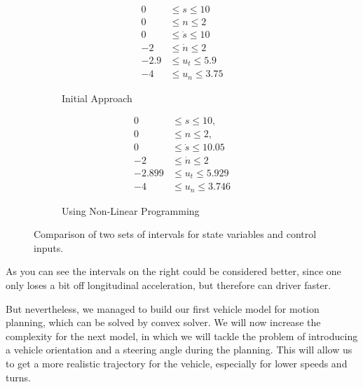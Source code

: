 \begin{figure}[h]
	\centering
	\begin{subfigure}[b]{0.45\textwidth}
		\centering
		\begin{align*}
			0    & \leq s \leq 10       \\
			0    & \leq n \leq 2        \\
			0    & \leq \dot{s} \leq 10 \\
			-2   & \leq \dot{n} \leq 2  \\
			-2.9 & \leq u_t \leq 5.9    \\
			-4   & \leq u_n \leq 3.75
		\end{align*}
		\caption{Initial Approach}
	\end{subfigure}
	\hfill
	\begin{subfigure}[b]{0.45\textwidth}
		\centering
		\begin{align*}
			0      & \leq s \leq 10,         \\
			0      & \leq n \leq 2,          \\
			0      & \leq \dot{s} \leq 10.05 \\
			-2     & \leq \dot{n} \leq 2     \\
			-2.899 & \leq u_t \leq 5.929     \\
			-4     & \leq u_n \leq 3.746
		\end{align*}
		\caption{Using Non-Linear Programming}
	\end{subfigure}
	\caption{Comparison of two sets of intervals for state variables and control inputs.}
\end{figure}

As you can see the intervals on the right could be considered better, since one only loses a bit off longitudinal acceleration, but therefore can
driver faster.

But nevertheless, we managed to build our first vehicle model for motion planning, which can be solved by convex solver.
We will now increase the complexity for the next model, in which we will tackle the problem of introducing a vehicle orientation and a steering angle
during the planning.
This will allow us to get a more realistic trajectory for the vehicle, especially for lower speeds and turns.
